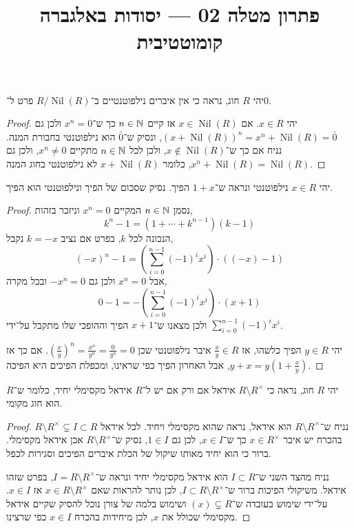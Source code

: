 
\title{פתרון מטלה 02 --- יסודות באלגברה קומוטטיבית}

\DeclareMathOperator{\Nil}{Nil}


\maketitle
\maketitleprint[red]

\question{}
יהי $R$ חוג, נראה כי אין איברים נילפוטנטיים ב־$R / \Nil(R)$ פרט ל־$0$.
\begin{proof}
	יהי $x \in R$.
	אם $x \in \Nil(R)$ אז קיים $n \in \NN$ כך ש־$x^n = 0$ ולכן גם ${(x + \Nil(R))}^n = x^n + \Nil(R) = \bar{0}$, ונסיק ש־$\bar{0}$ הוא נילפוטנטי בחבורת המנה.
	נניח אם כך ש־$x \notin \Nil(R)$, ולכן לכל $n \in \NN$ מתקיים $x^n \ne 0$, ולכן גם $x^n + \Nil(R) = \Nil(R)$, כלומר $x + \Nil(R)$ לא נילפוטנטי בחוג המנה.
\end{proof}

\question{}
יהי $x \in R$ נילפוטנטי ונראה ש־$1 + x$ הפיך.
נסיק שסכום של הפיך ונילפוטנטי הוא הפיך.
\begin{proof}
	נסמן $n \in \NN$ המקיים $x^n = 0$ וניזכר בזהות,
	\[
		k^n - 1
		= (1 + \cdots + k^{n - 1})(k - 1)
	\]
	הנכונה לכל $k$, בפרט אם נציב $k = -x$ נקבל,
	\[
		{(-x)}^n - 1
		= \left(\sum_{i = 0}^{n - 1} {(-1)}^i x^i\right) \cdot ((-x) - 1)
	\]
	אבל $x^n = 0$ ולכן גם $-x^n = 0$ ובכל מקרה,
	\[
		0 - 1
		= -\left(\sum_{i = 0}^{n - 1} {(-1)}^i x^i\right) \cdot (x + 1)
	\]
	ולכן מצאנו ש־$x + 1$ הפיך וההופכי שלו מתקבל על־ידי $\sum_{i = 0}^{n - 1} {(-1)}^i x^i$.

	יהי $y \in R$ הפיך כלשהו, אז $\frac{x}{y} \in R$ איבר נילפוטנטי שכן ${(\frac{x}{y})}^n = \frac{x^n}{y^n} = \frac{0}{y^n} = 0$.
	אם כך אז $y + x = y (1 + \frac{x}{y})$, אבל האחרון הפיך כפי שראינו, ומכפלת הפיכים היא הפיכה.
\end{proof}

\question{}
יהי $R$ חוג, נראה כי $R \setminus R^\times$ אידאל אם ורק אם יש ל־$R$ אידאל מקסימלי יחיד, כלומר ש־$R$ הוא חוג מקומי.
\begin{proof}
	נניח ש־$R \setminus R^\times$ הוא אידאל, נראה שהוא מקסימלי ויחיד.
	לכל אידאל $R \setminus R^\times \subsetneq I \subset R$ בהכרח יש איבר $x \in R^\times$ כך ש־$x \in I$, לכן גם $1 \in I$, נסיק ש־$R \setminus R^\times$ אכן אידאל מקסימלי.
	ברור כי הוא יחיד מאותו שיקול של הכלת איברים הפיכים וסגירות לכפל.

	נניח מהצד השני ש־$I \subset R$ הוא אידאל מקסימלי יחיד ונראה ש־$I = R \setminus R^\times$, בפרט שזהו אידאל.
	משיקולי הפיכות ברור ש־$I \subset R \setminus R^\times$, לכן נותר להראות שאם $x \in R \setminus R^\times$ אז $x \in I$.
	על־ידי שימוש בעובדה ש־$(x) \subsetneq R$ ושימוש בלמה של צורן נוכל להסיק שקיים אידאל מקסימלי שכולל את $x$, לכן מיחידות בהכרח $x \in I$ כפי שרצינו.
\end{proof}

